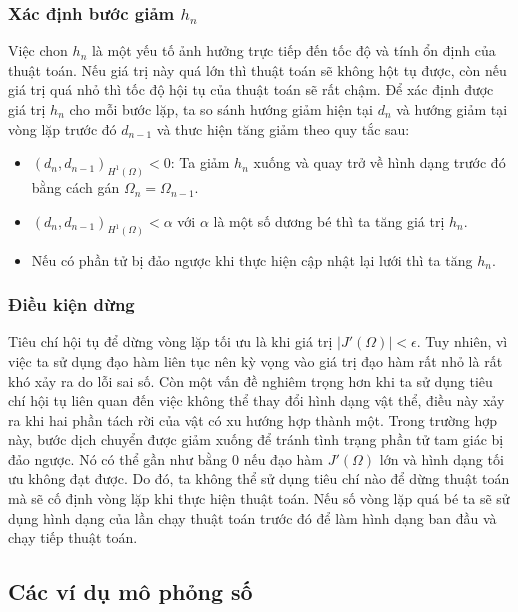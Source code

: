 \documentclass[
12pt, %
oneside, %
english, %
onehalfspacing, %
nolistspacing, %
headsepline, %
addchap,
]{MastersDoctoralThesis} %
\begin{document}
\subsubsection{Xác định bước giảm $h_n$}
Việc chon $h_n$ là một yếu tố ảnh hưởng trực tiếp đến tốc độ và tính ổn định của thuật toán. Nếu giá trị này quá lớn thì thuật toán sẽ không hột tụ được, còn nếu giá trị quá nhỏ thì tốc độ hội tụ của thuật toán sẽ rất chậm. Để xác định được giá trị $h_n$ cho mỗi bước lặp, ta so sánh hướng giảm hiện tại $d_n$ và hướng giảm tại vòng lặp trước đó $d_{n-1}$ và thưc hiện tăng giảm theo quy tắc sau:
\begin{itemize}
\item $(d_n,d_{n-1})_{H^1(\Omega)} < 0$: Ta giảm $h_n$ xuống và quay trở về hình dạng trước đó bằng cách gán $\Omega_n = \Omega_{n-1}$.
\item $(d_n,d_{n-1})_{H^1(\Omega)} < \alpha$ với $\alpha$ là một số dương bé thì ta tăng giá trị $h_n$.
\item Nếu có phần tử bị đảo ngược khi thực hiện cập nhật lại lưới thì ta tăng $h_n$.
\end{itemize}
\subsubsection{Điều kiện dừng}
Tiêu chí hội tụ để dừng vòng lặp tối ưu là khi giá trị $|J'(\Omega)|<\epsilon$. Tuy nhiên, vì việc ta sử dụng đạo hàm liên tục nên kỳ vọng vào giá trị đạo hàm rất nhỏ là rất khó xảy ra do lỗi sai số. Còn một vấn đề nghiêm trọng hơn khi ta sử dụng tiêu chí hội tụ liên quan đến việc không thể thay đổi hình dạng vật thể, điều này xảy ra khi hai phần tách rời của vật có xu hướng hợp thành một. Trong trường hợp này, bước dịch chuyển được giảm xuống để tránh tình trạng phần tử tam giác bị đảo ngược. Nó có thể gần như bằng $0$ nếu đạo hàm $J'(\Omega)$ lớn và hình dạng tối ưu không đạt được. Do đó, ta không thể sử dụng tiêu chí nào để dừng thuật toán mà sẽ cố định vòng lặp khi thực hiện thuật toán. Nếu số vòng lặp quá bé ta sẽ sử dụng hình dạng của lần chạy thuật toán trước đó để làm hình dạng ban đầu và chạy tiếp thuật toán.
\subsection{Các ví dụ mô phỏng số}
\end{document}
